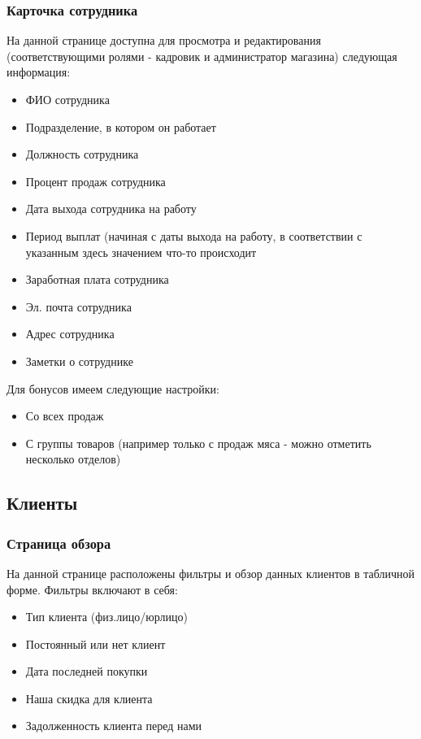 \documentclass[DIV=calc, paper=a4, fontsize=11pt]{scrartcl} %
\begin{document}
\subsubsection{Карточка сотрудника}

На данной странице доступна для просмотра и редактирования (соответствующими ролями - кадровик и администратор магазина) следующая информация:

\begin{itemize}
	\item ФИО сотрудника
	\item Подразделение, в котором он работает 
	\item Должность сотрудника
	\item Процент продаж сотрудника
	\item Дата выхода сотрудника на работу
	\item Период выплат (начиная с даты выхода на работу, в соответствии с указанным здесь значением что-то происходит 
	\item Заработная плата сотрудника
	\item Эл. почта сотрудника
	\item Адрес сотрудника
	\item Заметки о сотруднике
\end{itemize}

Для бонусов имеем следующие настройки:

\begin{itemize}
	\item Со всех продаж
	\item С группы товаров (например только с продаж мяса - можно отметить несколько отделов)
\end{itemize}

\subsection{Клиенты}

\subsubsection{Страница обзора}

На данной странице расположены фильтры и обзор данных клиентов в табличной форме. Фильтры включают в себя:

\begin{itemize}
	\item Тип клиента (физ.лицо/юрлицо)
	\item Постоянный или нет клиент
	\item Дата последней покупки
	\item Наша скидка для клиента
	\item Задолженность клиента перед нами
\end{itemize}
\end{document}
